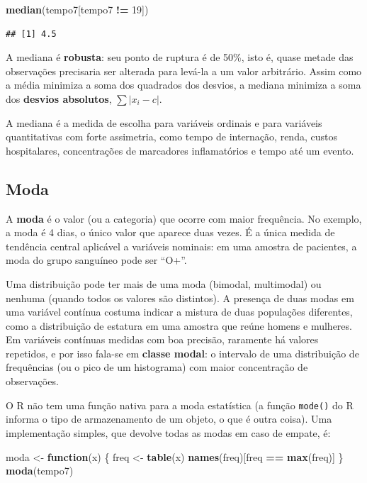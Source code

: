 \documentclass[
]{book}
\newenvironment{Shaded}{\begin{snugshade}}{\end{snugshade}}
\newcommand{\ControlFlowTok}[1]{\textcolor[rgb]{0.13,0.29,0.53}{\textbf{#1}}}
\newcommand{\DecValTok}[1]{\textcolor[rgb]{0.00,0.00,0.81}{#1}}
\newcommand{\FunctionTok}[1]{\textcolor[rgb]{0.13,0.29,0.53}{\textbf{#1}}}
\newcommand{\NormalTok}[1]{#1}
\newcommand{\OtherTok}[1]{\textcolor[rgb]{0.56,0.35,0.01}{#1}}
\newcommand{\SpecialCharTok}[1]{\textcolor[rgb]{0.81,0.36,0.00}{\textbf{#1}}}
\begin{document}
\begin{Shaded}
\begin{Highlighting}[]
\FunctionTok{median}\NormalTok{(tempo7[tempo7 }\SpecialCharTok{!=} \DecValTok{19}\NormalTok{])}
\end{Highlighting}
\end{Shaded}

\begin{verbatim}
## [1] 4.5
\end{verbatim}

A mediana é \textbf{robusta}: seu ponto de ruptura é de 50\%, isto é, quase metade das observações precisaria ser alterada para levá-la a um valor arbitrário. Assim como a média minimiza a soma dos quadrados dos desvios, a mediana minimiza a soma dos \textbf{desvios absolutos}, \(\sum |x_i - c|\).

A mediana é a medida de escolha para variáveis ordinais e para variáveis quantitativas com forte assimetria, como tempo de internação, renda, custos hospitalares, concentrações de marcadores inflamatórios e tempo até um evento.

\subsection{Moda}\label{moda}

A \textbf{moda} é o valor (ou a categoria) que ocorre com maior frequência. No exemplo, a moda é 4 dias, o único valor que aparece duas vezes. É a única medida de tendência central aplicável a variáveis nominais: em uma amostra de pacientes, a moda do grupo sanguíneo pode ser ``O+''.

Uma distribuição pode ter mais de uma moda (bimodal, multimodal) ou nenhuma (quando todos os valores são distintos). A presença de duas modas em uma variável contínua costuma indicar a mistura de duas populações diferentes, como a distribuição de estatura em uma amostra que reúne homens e mulheres. Em variáveis contínuas medidas com boa precisão, raramente há valores repetidos, e por isso fala-se em \textbf{classe modal}: o intervalo de uma distribuição de frequências (ou o pico de um histograma) com maior concentração de observações.

O R não tem uma função nativa para a moda estatística (a função \texttt{mode()} do R informa o tipo de armazenamento de um objeto, o que é outra coisa). Uma implementação simples, que devolve todas as modas em caso de empate, é:

\begin{Shaded}
\begin{Highlighting}[]
\NormalTok{moda }\OtherTok{\textless{}{-}} \ControlFlowTok{function}\NormalTok{(x) \{}
\NormalTok{  freq }\OtherTok{\textless{}{-}} \FunctionTok{table}\NormalTok{(x)}
  \FunctionTok{names}\NormalTok{(freq)[freq }\SpecialCharTok{==} \FunctionTok{max}\NormalTok{(freq)]}
\NormalTok{\}}
\FunctionTok{moda}\NormalTok{(tempo7)}
\end{Highlighting}
\end{Shaded}
\end{document}
